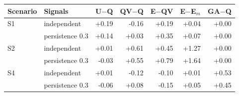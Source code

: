 \begin{tabular}{@{}llrrrrr@{}}
\toprule
Scenario & Signals & U$-$Q & QV$-$Q & E$-$QV & E$-$E$_m$ & GA$-$Q \\
\midrule
S1 & independent & +0.19 & -0.16 & +0.19 & +0.04 & +0.00 \\
 & persistence 0.3 & +0.14 & +0.03 & +0.35 & +0.07 & +0.00 \\
S2 & independent & +0.01 & +0.61 & +0.45 & +1.27 & +0.00 \\
 & persistence 0.3 & -0.03 & +0.55 & +0.79 & +1.64 & +0.00 \\
S4 & independent & +0.01 & -0.12 & -0.10 & +0.01 & +0.53 \\
 & persistence 0.3 & -0.06 & +0.08 & -0.15 & +0.05 & +0.45 \\
\bottomrule
\end{tabular}